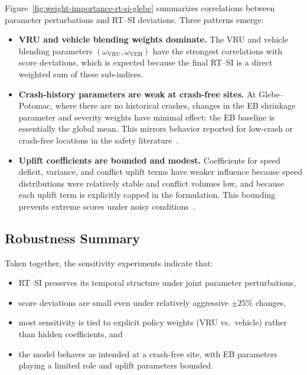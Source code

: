 \documentclass[conference]{IEEEtran}
\begin{document}
Figure~\ref{fig:weight-importance-rt-si-glebe} summarizes correlations between parameter
perturbations and RT--SI deviations. Three patterns emerge:

\begin{itemize}
    \item \textbf{VRU and vehicle blending weights dominate.}  
    The VRU and vehicle blending parameters
    $(\omega_{\mathrm{VRU}}, \omega_{\mathrm{VEH}})$ have the strongest correlations
    with score deviations, which is expected because the final RT--SI is a direct
    weighted sum of these sub-indices.

    \item \textbf{Crash-history parameters are weak at crash-free sites.}  
    At Glebe--Potomac, where there are no historical crashes, changes in the EB
    shrinkage parameter and severity weights have minimal effect: the EB baseline is
    essentially the global mean. This mirrors behavior reported for low-crash or
    crash-free locations in the safety literature~\cite{montella2020systemic}.

    \item \textbf{Uplift coefficients are bounded and modest.}  
    Coefficients for speed deficit, variance, and conflict uplift terms have weaker
    influence because speed distributions were relatively stable and conflict volumes
    low, and because each uplift term is explicitly capped in the formulation. This
    bounding prevents extreme scores under noisy conditions~\cite{gettman2003ssam}.
\end{itemize}

\subsection{Robustness Summary}

Taken together, the sensitivity experiments indicate that:

\begin{itemize}
    \item RT--SI preserves its temporal structure under joint parameter perturbations,
    \item score deviations are small even under relatively aggressive $\pm 25\%$ changes,
    \item most sensitivity is tied to explicit policy weights (VRU vs.\ vehicle) rather
          than hidden coefficients, and
    \item the model behaves as intended at a crash-free site, with EB parameters playing
          a limited role and uplift parameters bounded.
\end{itemize}
\end{document}
